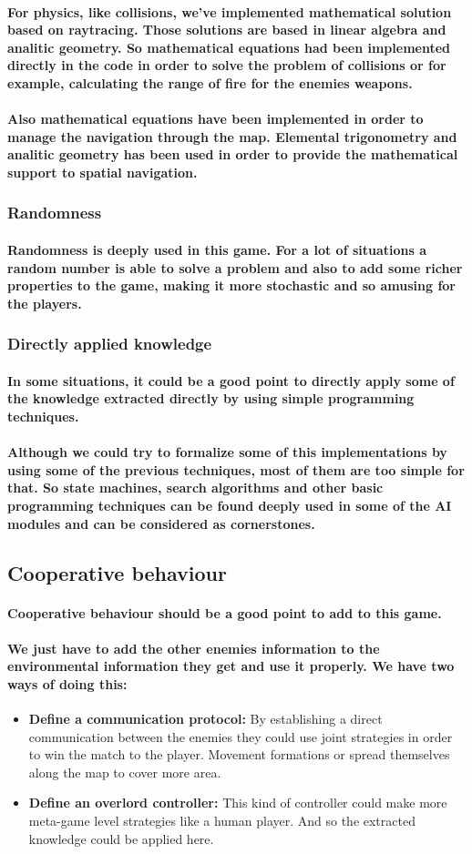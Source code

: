 \documentclass[a4paper,10pt]{article}
\newcommand{\p}[1]{\paragraph{\indent\textnormal{#1}}}
\begin{document}
      \p{For physics, like collisions, we've implemented mathematical solution based on raytracing. Those solutions are based in linear algebra and analitic geometry. So mathematical equations had been implemented directly in the code in order to solve the problem of collisions or for example, calculating the range of fire for the enemies weapons.}

      \p{Also mathematical equations have been implemented in order to manage the navigation through the map. Elemental trigonometry and analitic geometry has been used in order to provide the mathematical support to spatial navigation.}

    \subsubsection{Randomness}

      \p{Randomness is deeply used in this game. For a lot of situations a random number is able to solve a problem and also to add some richer properties to the game, making it more stochastic and so amusing for the players.}

    \subsubsection{Directly applied knowledge}

      \p{In some situations, it could be a good point to directly apply some of the knowledge extracted directly by using simple programming techniques.}

      \p{Although we could try to formalize some of this implementations by using some of the previous techniques, most of them are too simple for that. So state machines, search algorithms and other basic programming techniques can be found deeply used in some of the AI modules and can be considered as cornerstones.}

  \subsection{Cooperative behaviour}

      \p{Cooperative behaviour should be a good point to add to this game.}
      
      \p{We just have to add the other enemies information to the environmental information they get and use it properly. We have two ways of doing this:}

	\begin{itemize}
	 \item \textbf{Define a communication protocol:} By establishing a direct communication between the enemies they could use joint strategies in order to win the match to the player. Movement formations or spread themselves along the map to cover more area.
	 \item \textbf{Define an overlord controller:} This kind of controller could make more meta-game level strategies like a human player. And so the extracted knowledge could be applied here.
	\end{itemize}
\end{document}
